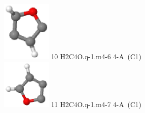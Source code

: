 \documentclass[10pt]{article}
\begin{document}
\begin{tabular}
\includegraphics[width=2.40000000000000000000cm]{H2C4O.q-1.m4-6.eps} \tiny{10 \hspace{1.20000000000000000000cm} H2C4O.q-1.m4-6 \hspace{5pt} 4-A~(C1)} 
\\\hline
\includegraphics[width=2.40000000000000000000cm]{H2C4O.q-1.m4-7.eps} \tiny{11 \hspace{1.20000000000000000000cm} H2C4O.q-1.m4-7 \hspace{5pt} 4-A~(C1)} 
\\
\end{tabular}
\end{document}
